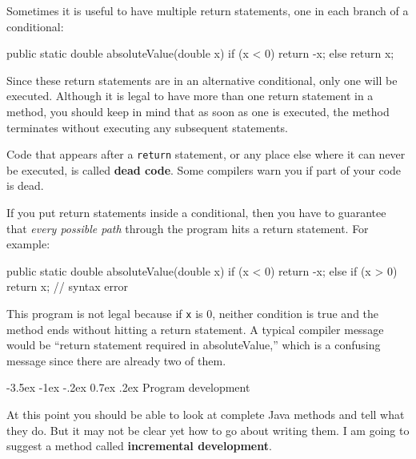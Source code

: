 \documentclass[12pt]{book}
\makeatletter
\renewcommand{\section}{\@startsection {section}{1}{\z@}%
    {-3.5ex \@plus -1ex \@minus -.2ex}%
    {0.7ex \@plus.2ex}%
    {\normalfont\Large\bfseries}}
\theoremstyle{exercise}
\makeatother
\begin{document}

Sometimes it is useful to have multiple return statements, one in each branch of a conditional:

\begin{code}
    public static double absoluteValue(double x) {
        if (x < 0) {
            return -x;
        } else {
            return x;
        }
    }
\end{code}

Since these return statements are in an alternative conditional, only one will be executed.
Although it is legal to have more than one return statement in a method, you should keep in mind that as soon as one is executed, the method terminates without executing any subsequent statements.


Code that appears after a {\tt return} statement, or any place else where it can never be executed, is called {\bf dead code}.
Some compilers warn you if part of your code is dead.

If you put return statements inside a conditional, then you have to guarantee that {\em every possible path} through the program hits a return statement.
For example:

\begin{code}
    public static double absoluteValue(double x) {
        if (x < 0) {
            return -x;
        } else if (x > 0) {
            return x;
        }
        // syntax error
    }
\end{code}

This program is not legal because if {\tt x} is 0, neither condition is true and the method ends without hitting a return statement.
A typical compiler message would be ``return statement required in absoluteValue,'' which is a confusing message since there are already two of them.


\section{Program development}
\label{distance}


At this point you should be able to look at complete Java methods and tell what they do.
But it may not be clear yet how to go about writing them.
I am going to suggest a method called {\bf incremental development}.
\end{document}
